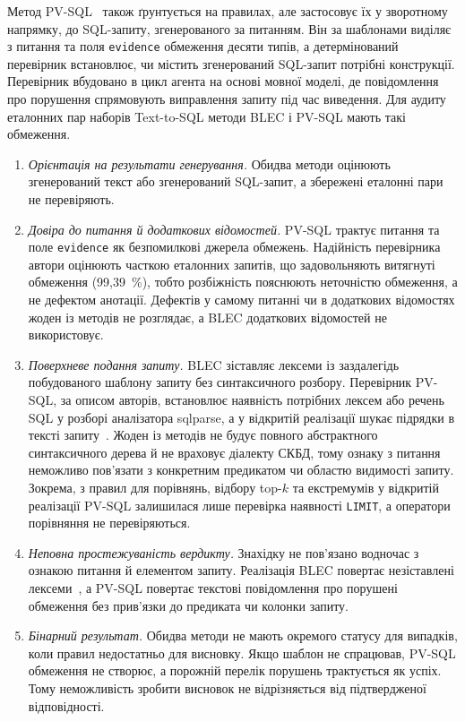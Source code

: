 \documentclass[a4paper,14pt,oneside]{extreport}
\begin{document}
Метод PV-SQL~\cite{tian2026pvsql} також ґрунтується на правилах, але застосовує їх у зворотному напрямку, до SQL-запиту, згенерованого за питанням. Він за шаблонами виділяє з питання та поля \texttt{evidence} обмеження десяти типів, а детермінований перевірник встановлює, чи містить згенерований SQL-запит потрібні конструкції. Перевірник вбудовано в цикл агента на основі мовної моделі, де повідомлення про порушення спрямовують виправлення запиту під час виведення. Для аудиту еталонних пар наборів Text-to-SQL методи BLEC і PV-SQL мають такі обмеження.
\begin{enumerate}\setlength{\itemsep}{0pt}\setlength{\parsep}{0pt}\setlength{\parskip}{0pt}
\item \textit{Орієнтація на результати генерування.} Обидва методи оцінюють згенерований текст або згенерований SQL-запит, а збережені еталонні пари не перевіряють.
\item \textit{Довіра до питання й додаткових відомостей.} PV-SQL трактує питання та поле \texttt{evidence} як безпомилкові джерела обмежень. Надійність перевірника автори оцінюють часткою еталонних запитів, що задовольняють витягнуті обмеження (99,39~\%), тобто розбіжність пояснюють неточністю обмеження, а не дефектом анотації. Дефектів у самому питанні чи в додаткових відомостях жоден із методів не розглядає, а BLEC додаткових відомостей не використовує.
\item \textit{Поверхневе подання запиту.} BLEC зіставляє лексеми із заздалегідь побудованого шаблону запиту без синтаксичного розбору. Перевірник PV-SQL, за описом авторів, встановлює наявність потрібних лексем або речень SQL у розборі аналізатора sqlparse, а у відкритій реалізації шукає підрядки в тексті запиту~\cite{pvsqlRepo}. Жоден із методів не будує повного абстрактного синтаксичного дерева й не враховує діалекту СКБД, тому ознаку з питання неможливо пов'язати з конкретним предикатом чи областю видимості запиту. Зокрема, з правил для порівнянь, відбору top-$k$ та екстремумів у відкритій реалізації PV-SQL залишилася лише перевірка наявності \texttt{LIMIT}, а оператори порівняння не перевіряються.
\item \textit{Неповна простежуваність вердикту.} Знахідку не пов'язано водночас з ознакою питання й елементом запиту. Реалізація BLEC повертає незіставлені лексеми~\cite{blecRepo}, а PV-SQL повертає текстові повідомлення про порушені обмеження без прив'язки до предиката чи колонки запиту.
\item \textit{Бінарний результат.} Обидва методи не мають окремого статусу для випадків, коли правил недостатньо для висновку. Якщо шаблон не спрацював, PV-SQL обмеження не створює, а порожній перелік порушень трактується як успіх. Тому неможливість зробити висновок не відрізняється від підтвердженої відповідності.
\end{enumerate}
\end{document}
